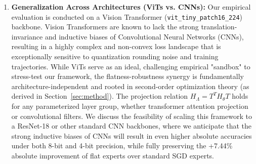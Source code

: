 \begin{enumerate}
  \item \textbf{Generalization Across Architectures (ViTs vs. CNNs):} Our empirical evaluation is conducted on a Vision Transformer (\texttt{vit\_tiny\_patch16\_224}) backbone. Vision Transformers are known to lack the strong translation-invariance and inductive biases of Convolutional Neural Networks (CNNs), resulting in a highly complex and non-convex loss landscape that is exceptionally sensitive to quantization rounding noise and training trajectories. While ViTs serve as an ideal, challenging empirical "sandbox" to stress-test our framework, the flatness-robustness synergy is fundamentally architecture-independent and rooted in second-order optimization theory (as derived in Section~\ref{sec:method}). The projection relation $H_{\Lambda} = T^T H_{\theta} T$ holds for any parameterized layer group, whether transformer attention projection or convolutional filters. We discuss the feasibility of scaling this framework to a ResNet-18 or other standard CNN backbones, where we anticipate that the strong inductive biases of CNNs will result in even higher absolute accuracies under both 8-bit and 4-bit precision, while fully preserving the +7.44\% absolute improvement of flat experts over standard SGD experts.
\end{enumerate}


